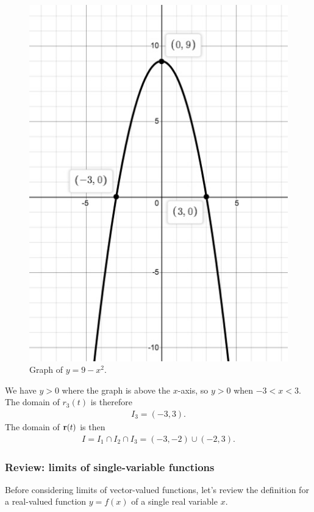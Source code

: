 \documentclass[12pt,letterpaper,reqno]{article}
\numberwithin{equation}{section}
\newcommand{\bbr}{{\bf r}}
\begin{document}
{{\begin{solution}
	\begin{figure}[h]
	\begin{center}
		\includegraphics[scale=0.3]{figures_mvc/parab_down}
	\end{center}
	\caption{Graph of $y=9-x^2$.}
\end{figure}
	We have $y>0$ where the graph is above the $x$-axis, so $y>0$ when $-3<x<3$. The domain of $r_3(t)$ is therefore
	\begin{align*}
		I_3=(-3,3).
	\end{align*}
	The domain of $\bbr(t)$ is then
	\begin{align*}
		I=I_1 \cap I_2 \cap I_3=(-3,-2)\cup (-2,3).
	\end{align*}
\end{solution}}

\subsubsection{Review: limits of single-variable functions}
Before considering limits of vector-valued functions, let's review the definition for a real-valued function $y=f(x)$ of a single real variable $x$.

}
\end{document}
